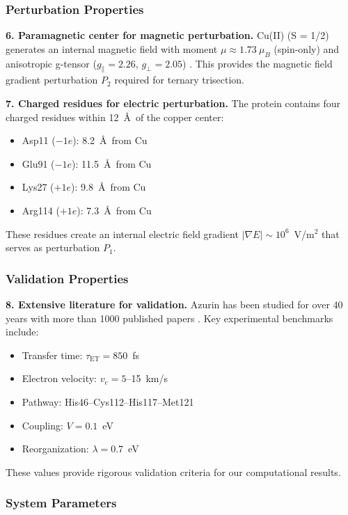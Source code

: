 \documentclass[twocolumn,10pt]{article}
\begin{document}
\subsubsection{Perturbation Properties}

\textbf{6. Paramagnetic center for magnetic perturbation.} Cu(II) (S = 1/2) 
generates an internal magnetic field with moment $\mu \approx 1.73~\mu_B$ 
(spin-only) and anisotropic g-tensor ($g_\parallel = 2.26$, $g_\perp = 2.05$) 
\cite{Solomon2004}. This provides the magnetic field gradient perturbation 
$P_2$ required for ternary trisection.

\textbf{7. Charged residues for electric perturbation.} The protein contains 
four charged residues within 12~\AA\ of the copper center:
%
\begin{itemize}
\item Asp11 ($-1e$): 8.2~\AA\ from Cu
\item Glu91 ($-1e$): 11.5~\AA\ from Cu  
\item Lys27 ($+1e$): 9.8~\AA\ from Cu
\item Arg114 ($+1e$): 7.3~\AA\ from Cu
\end{itemize}
%
These residues create an internal electric field gradient $|\nabla E| \sim 10^6$~V/m$^2$ 
that serves as perturbation $P_1$.

\subsubsection{Validation Properties}

\textbf{8. Extensive literature for validation.} Azurin has been studied for 
over 40 years with more than 1000 published papers \cite{Gray2003}. Key 
experimental benchmarks include:
%
\begin{itemize}
\item Transfer time: $\tau_{\text{ET}} = 850$~fs \cite{Crane2001}
\item Electron velocity: $v_e = 5$--15~km/s \cite{Gray2003}
\item Pathway: His46--Cys112--His117--Met121 \cite{Beratan1992}
\item Coupling: $V = 0.1$~eV \cite{Gray2005}
\item Reorganization: $\lambda = 0.7$~eV \cite{Winkler1997}
\end{itemize}
%
These values provide rigorous validation criteria for our computational results.

\subsubsection{System Parameters}
\end{document}
